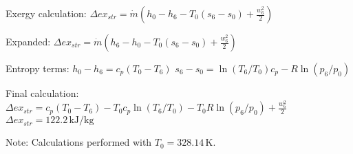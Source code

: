 Exergy calculation:  
\( \Delta ex_{str} = \dot{m} (h_0 - h_6 - T_0 (s_6 - s_0) + \frac{w_6^2}{2}) \)  

Expanded:  
\( \Delta ex_{str} = \dot{m} (h_6 - h_0 - T_0 (s_6 - s_0) + \frac{w_6^2}{2}) \)  

Entropy terms:  
\( h_0 - h_6 = c_p (T_0 - T_6) \)  
\( s_6 - s_0 = \ln (T_6 / T_0) c_p - R \ln (p_6 / p_0) \)  

Final calculation:  
\( \Delta ex_{str} = c_p (T_0 - T_6) - T_0 c_p \ln (T_6 / T_0) - T_0 R \ln (p_6 / p_0) + \frac{w_6^2}{2} \)  
\( \Delta ex_{str} = 122.2 \, \text{kJ/kg} \)  

Note: Calculations performed with \( T_0 = 328.14 \, \text{K} \).